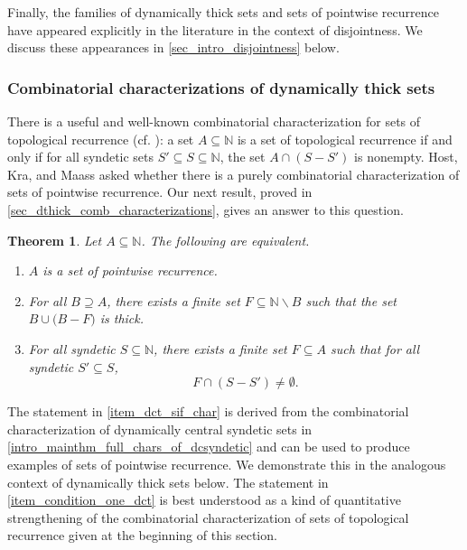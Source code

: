 \documentclass[letter,11pt]{article}
\theoremstyle{plain}
\theoremstyle{definition}
\theoremstyle{plain}
\newcounter{MainTheoremCounter}
\newtheorem{Maintheorem}[MainTheoremCounter]{Theorem}
\theoremstyle{plain}
\numberwithin{equation}{section}
\newcommand{\N}{\mathbb{N}}
\renewcommand{\setminus}{\backslash}
\begin{document}
Finally, the families of dynamically thick sets and sets of pointwise recurrence have appeared explicitly in the literature in the context of disjointness.  We discuss these appearances in \cref{sec_intro_disjointness} below.

\subsubsection{Combinatorial characterizations of dynamically thick sets}

There is a useful and well-known combinatorial characterization for sets of topological recurrence (cf. \cite[Thm. 2.4]{bergelson_mccutcheon_1998}): a set $A \subseteq \N$ is a set of topological recurrence if and only if for all syndetic sets $S' \subseteq S \subseteq \N$, the set $A \cap (S - S')$ is nonempty.  Host, Kra, and Maass \cite[Question 2.13]{HostKraMaass2016} asked whether there is a purely combinatorial characterization of sets of pointwise recurrence.  Our next result, proved in \cref{sec_dthick_comb_characterizations}, gives an answer to this question.


\begin{Maintheorem}
\label{mainthm_dct_combo_characterizations}
    Let $A \subseteq \N$.  The following are equivalent.
    \begin{enumerate}
        \item
        \label{item_intro_dct_def_char}
        $A$ is a set of pointwise recurrence.

        \item
        \label{item_intro_dct_sif_char}
        For all $B \supseteq A$, there exists a finite set $F \subseteq \N \setminus B$ such that the set $B \cup \big( B-F \big)$ is thick.

        \item
        \label{item_intro_condition_one_dct}
        For all syndetic $S \subseteq \N$, there exists a finite set $F \subseteq A$ such that for all syndetic $S' \subseteq S$,
        \[F \cap (S - S') \neq \emptyset.\]
    \end{enumerate}
\end{Maintheorem}

The statement in \eqref{item_dct_sif_char} is derived from the combinatorial characterization of dynamically central syndetic sets in \cref{intro_mainthm_full_chars_of_dcsyndetic} and can be used to produce examples of sets of pointwise recurrence.  We demonstrate this in the analogous context of dynamically thick sets below.  The statement in \eqref{item_condition_one_dct} is best understood as a kind of quantitative strengthening of the combinatorial characterization of sets of topological recurrence given at the beginning of this section.
\end{document}
